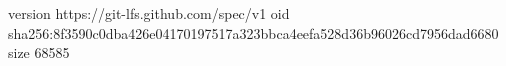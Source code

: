 version https://git-lfs.github.com/spec/v1
oid sha256:8f3590c0dba426e04170197517a323bbca4eefa528d36b96026cd7956dad6680
size 68585
